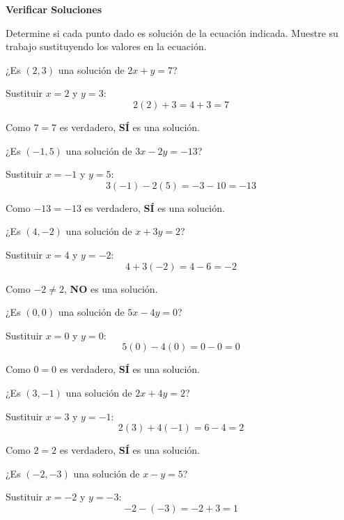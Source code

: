 \begin{exercise}
\textbf{Verificar Soluciones}

Determine si cada punto dado es solución de la ecuación indicada. Muestre su trabajo sustituyendo los valores en la ecuación.

\problem ¿Es $(2, 3)$ una solución de $2x + y = 7$?

\begin{solucion}
Sustituir $x = 2$ y $y = 3$:
$$2(2) + 3 = 4 + 3 = 7$$

Como $7 = 7$ es verdadero, \textbf{SÍ} es una solución.
\end{solucion}

\problem ¿Es $(-1, 5)$ una solución de $3x - 2y = -13$?

\begin{solucion}
Sustituir $x = -1$ y $y = 5$:
$$3(-1) - 2(5) = -3 - 10 = -13$$

Como $-13 = -13$ es verdadero, \textbf{SÍ} es una solución.
\end{solucion}

\problem ¿Es $(4, -2)$ una solución de $x + 3y = 2$?

\begin{solucion}
Sustituir $x = 4$ y $y = -2$:
$$4 + 3(-2) = 4 - 6 = -2$$

Como $-2 \neq 2$, \textbf{NO} es una solución.
\end{solucion}

\problem ¿Es $(0, 0)$ una solución de $5x - 4y = 0$?

\begin{solucion}
Sustituir $x = 0$ y $y = 0$:
$$5(0) - 4(0) = 0 - 0 = 0$$

Como $0 = 0$ es verdadero, \textbf{SÍ} es una solución.
\end{solucion}

\problem ¿Es $(3, -1)$ una solución de $2x + 4y = 2$?

\begin{solucion}
Sustituir $x = 3$ y $y = -1$:
$$2(3) + 4(-1) = 6 - 4 = 2$$

Como $2 = 2$ es verdadero, \textbf{SÍ} es una solución.
\end{solucion}

\problem ¿Es $(-2, -3)$ una solución de $x - y = 5$?

\begin{solucion}
Sustituir $x = -2$ y $y = -3$:
$$-2 - (-3) = -2 + 3 = 1$$


\end{solucion}
\end{exercise}
